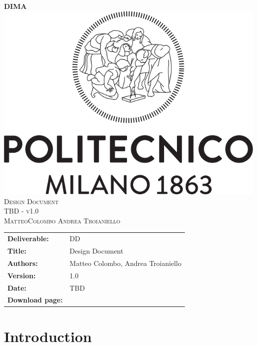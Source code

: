 
\usepackage{float}
\usepackage[section]{placeins}


\begin{titlepage}
	\begin{center}
		\Huge{\bfseries{DIMA}}\\
		[3cm]
		\includegraphics[scale=0.3]{images/polimi}\\
		[3cm]
		\textsc{\Huge Design Document}\\[1cm]
		\textsc{\huge TBD - v1.0}\\
		[4cm]
		\textsc{\normalsize MatteoColombo \hspace{0.4cm} Andrea Troianiello }
	\end{center}
\end{titlepage}
	
\begin{table}[h!]
\begin{tabu} to \textwidth { X[0.3,r,p] X[0.7,l,p] }
\hline

\textbf{Deliverable:} & DD\\
\textbf{Title:} & Design Document \\
\textbf{Authors:} & Matteo Colombo, Andrea Troianiello \\
\textbf{Version:} & 1.0 \\ 
\textbf{Date:} & TBD \\
\textbf{Download page:} & \href{https://github.com/MatteoColombo/dima-2018-colombo-troianiello}{\color{Black}{GitHub - DIMA-2018-Colombo-Troianiello repository}} \\
\hline
\end{tabu}
\end{table}

\clearpage
\tableofcontents
\listoffigures
\listoftables



\clearpage
{\section{Introduction}}
\label{sect:introduction}


